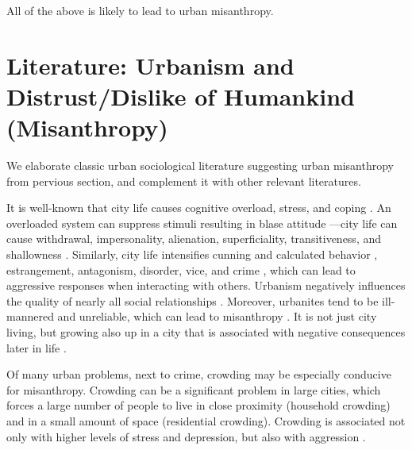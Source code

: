 \documentclass[11pt, letterpaper]{article}
\begin{document}
\begin{spacing}{1.4}
All of the above is likely to lead to urban misanthropy. 

\section*{Literature: Urbanism and Distrust/Dislike of Humankind (Misanthropy)}

We elaborate classic urban sociological literature suggesting urban
misanthropy from pervious section, and complement it with other relevant literatures.

It is well-known that city life causes cognitive overload, stress, and coping \citep{simmel03, milgram70,lederbogen11}. An overloaded system can suppress stimuli resulting in blase attitude
\citep{simmel03}---city life can cause withdrawal, impersonality, alienation, superficiality, transitiveness, and shallowness \citep{wirth38}. Similarly, city life intensifies cunning and calculated behavior \citep{tonnies57}, estrangement, antagonism, disorder, vice, and crime
\citep{milgram70,park15,park84,bettencourt10b}, which can lead to aggressive
responses when interacting with others.
%
Urbanism negatively influences the quality of nearly all social relationships
\citep{wilson85}. Moreover, urbanites tend to be ill-mannered and unreliable,
which can lead to misanthropy
\citep[e.g.,][]{aokCityBook15,aok-sizeFetish17}. It is not just city living, but
growing also up in a city that is  associated with negative consequences later in life \citep{lederbogen11,aok20}.

%
Of many urban problems, next to crime, crowding may be especially conducive for
misanthropy.  
Crowding can be a significant problem in large cities, which forces a large number of people to live in close proximity (household crowding) and in a small amount of space (residential crowding). Crowding is associated not only with higher levels of stress and depression, but also with aggression \citep{regoeczi2008,calhoun62}. 


\end{spacing}
\end{document}
